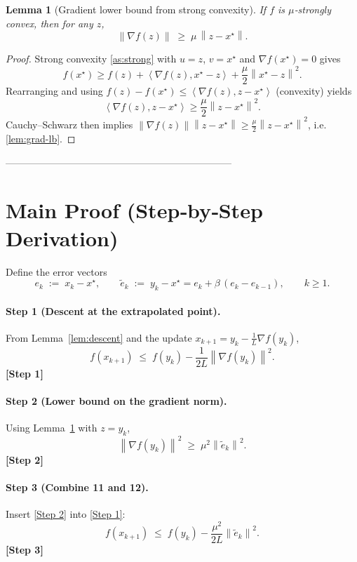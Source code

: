 \documentclass{article}
\newtheorem{lemma}{Lemma}
\newcommand{\norm}[1]{\left\lVert#1\right\rVert}
\newcommand{\inner}[2]{\left\langle #1,#2\right\rangle}
\begin{document}
\begin{lemma}[Gradient lower bound from strong convexity]\label{lem:grad-lb}
If $f$ is $\mu$‑strongly convex, then for any $z$,
\[
\norm{\nabla f(z)}\;\ge\;\mu\,\norm{z-x^{\star}}.
\tag{9}
\]
\end{lemma}
\begin{proof}
Strong convexity \eqref{as:strong} with $u=z$, $v=x^{\star}$ and $\nabla f(x^{\star})=0$ gives  
\[
f(x^{\star})\ge f(z)+\inner{\nabla f(z)}{x^{\star}-z}+\frac{\mu}{2}\norm{x^{\star}-z}^{2}.
\]
Rearranging and using $f(z)-f(x^{\star})\le\inner{\nabla f(z)}{z-x^{\star}}$
(convexity) yields
\[
\inner{\nabla f(z)}{z-x^{\star}}\ge\frac{\mu}{2}\norm{z-x^{\star}}^{2}.
\]
Cauchy–Schwarz then implies $\norm{\nabla f(z)}\norm{z-x^{\star}}
\ge\frac{\mu}{2}\norm{z-x^{\star}}^{2}$, i.e. \eqref{lem:grad-lb}.
\end{proof}

---------------------------------------------------------------------

\section*{Main Proof (Step‑by‑Step Derivation)}
Define the error vectors
\[
e_{k}\;:=\;x_{k}-x^{\star},\qquad
\tilde e_{k}\;:=\;y_{k}-x^{\star}=e_{k}+\beta\,(e_{k}-e_{k-1}),\qquad k\ge 1.
\tag{10}
\]

\paragraph{Step 1 (Descent at the extrapolated point).}
From Lemma~\ref{lem:descent} and the update $x_{k+1}=y_{k}-\frac1L\nabla f(y_{k})$,
\[
f(x_{k+1})\;\le\; f(y_{k})-\frac{1}{2L}\norm{\nabla f(y_{k})}^{2}.
\tag{11}
\]
\textbf{[Step 1]}

\paragraph{Step 2 (Lower bound on the gradient norm).}
Using Lemma~\ref{lem:grad-lb} with $z=y_{k}$,
\[
\norm{\nabla f(y_{k})}^{2}\;\ge\;\mu^{2}\norm{\tilde e_{k}}^{2}.
\tag{12}
\]
\textbf{[Step 2]}

\paragraph{Step 3 (Combine 11 and 12).}
Insert \eqref{Step 2} into \eqref{Step 1}:
\[
f(x_{k+1})\;\le\; f(y_{k})-\frac{\mu^{2}}{2L}\norm{\tilde e_{k}}^{2}.
\tag{13}
\]
\textbf{[Step 3]}
\end{document}
